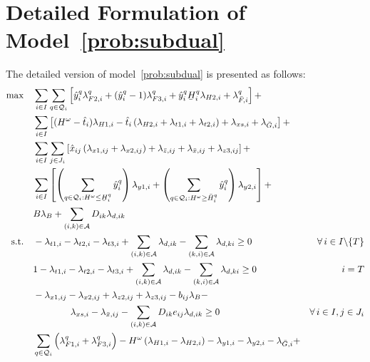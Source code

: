 \documentclass[11pt]{article}
\newcommand{\cA}{{\cal A}}
\newcommand{\cQ}{{\cal Q}}
\newcommand{\st}{\mbox{s.t.}}
\renewcommand{\underbar}{\underaccent{\bar}}
\begin{document}
	
	
	
	\pagebreak
	
	\appendix
	\section{Detailed Formulation of Model~\eqref{prob:subdual}} \label{appen:probdual}
	The detailed version of model~\eqref{prob:subdual} is presented as follows:
	\begin{subequations}
		\begin{align}
		\max \quad & \sum_{i \in I} \sum_{q \in \cQ_i} \left[
		\hat{y}_i^q \lambda_{F2,i}^q + (\hat{y}_i^q - 1) \lambda_{F3,i}^q + \hat{y}_i^q \underbar{H}_i^q \lambda_{H2,i} + \lambda_{\bar{F},i}^q \right] + &\nonumber \\
		& \sum_{i \in I} \left[(H^\omega - \hat{t}_i) \lambda_{H1,i} - \hat{t}_i \left(\lambda_{H2,i} + \lambda_{t1,i} + \lambda_{t2,i} \right) + \lambda_{xs,i} + \lambda_{\bar{G},i} \right] + &\nonumber \\
		& \sum_{i \in I} \sum_{j \in J_i} \left[\hat{x}_{ij} \left(\lambda_{x1,ij} + \lambda_{x2,ij} \right) + \lambda_{\bar{z},ij} + \lambda_{\bar{x},ij} + \lambda_{z3,ij}\right] + &\nonumber \\
		& \sum_{i \in I} \left[ \left(\sum_{q \in \cQ_i: H^\omega \leq \underbar{H}_i^q} \hat{y}_i^q \right) \lambda_{y1,i} + \left(\sum_{q \in \cQ_i: H^\omega \geq \bar{H}_i^q} \hat{y}_i^q \right) \lambda_{y2,i} \right] + &\nonumber \\
		& B \lambda_{B} + \sum_{(i,k) \in \cA} D_{ik} \lambda_{d,ik} &\\
		\st \quad & -\lambda_{t1,i} - \lambda_{t2,i} -\lambda_{t3,i} + \sum_{(i,k) \in \cA} \lambda_{d,ik} - \sum_{(k,i) \in \cA} \lambda_{d,ki} \geq 0 & \forall\, i \in I\backslash\{T\} \label{cons:dualt1}\\
		& 1 - \lambda_{t1,i} - \lambda_{t2,i} -\lambda_{t3,i} + \sum_{(i,k) \in \cA} \lambda_{d,ik} - \sum_{(k,i) \in \cA} \lambda_{d,ki} \geq 0 & i = T \label{cons:dualt2}\\
		& -\lambda_{x1,ij} -\lambda_{x2,ij} +\lambda_{z2,ij} + \lambda_{z3,ij} - b_{ij} \lambda_B - & \nonumber \\
		& \qquad \qquad \lambda_{xs,i} - \lambda_{\bar{x},ij} - \sum_{(i,k) \in \cA} D_{ik} e_{ij} \lambda_{d,ik} \geq 0 & \forall\, i \in I, j \in J_i \label{cons:dualx}\\
		& \sum_{q \in \cQ_i} \left(\lambda_{F1,i}^q + \lambda_{F3,i}^q \right) - H^\omega \left(\lambda_{H1,i} - \lambda_{H2,i} \right) - \lambda_{y1,i} - \lambda_{y2,i} - \lambda_{\bar{G},i} + & \nonumber \\ 

\end{align}
\end{subequations}
\end{document}
